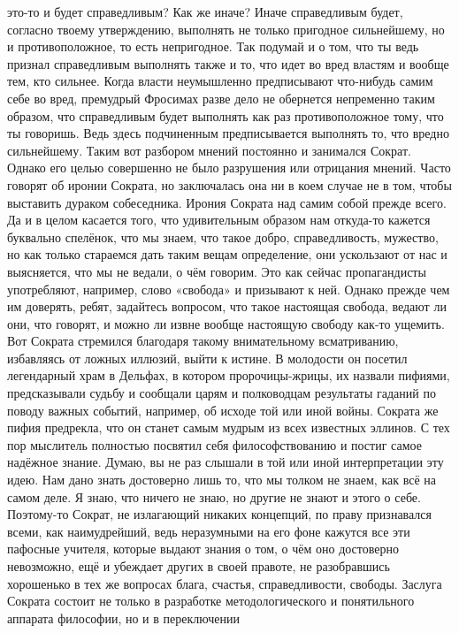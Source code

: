 это-то и будет справедливым? Как же иначе? Иначе справедливым будет, согласно
твоему утверждению, выполнять не только пригодное сильнейшему, но и
противоположное, то есть непригодное. Так подумай и о том, что ты ведь признал
справедливым выполнять также и то, что идет во вред властям и вообще тем, кто
сильнее. Когда власти неумышленно предписывают что-нибудь самим себе во вред,
премудрый Фросимах разве дело не обернется непременно таким образом, что
справедливым будет выполнять как раз противоположное тому, что ты говоришь. Ведь
здесь подчиненным предписывается выполнять то, что вредно сильнейшему. Таким вот
разбором мнений постоянно и занимался Сократ. Однако его целью совершенно не
было разрушения или отрицания мнений. Часто говорят об иронии Сократа, но
заключалась она ни в коем случае не в том, чтобы выставить дураком собеседника.
Ирония Сократа над самим собой прежде всего. Да и в целом касается того, что
удивительным образом нам откуда-то кажется буквально спелёнок, что мы знаем, что
такое добро, справедливость, мужество, но как только стараемся дать таким вещам
определение, они ускользают от нас и выясняется, что мы не ведали, о чём
говорим. Это как сейчас пропагандисты употребляют, например, слово «свобода» и
призывают к ней. Однако прежде чем им доверять, ребят, задайтесь вопросом, что
такое настоящая свобода, ведают ли они, что говорят, и можно ли извне вообще
настоящую свободу как-то ущемить. Вот Сократа стремился благодаря такому
внимательному всматриванию, избавляясь от ложных иллюзий, выйти к истине. В
молодости он посетил легендарный храм в Дельфах, в котором пророчицы-жрицы, их
назвали пифиями, предсказывали судьбу и сообщали царям и полководцам результаты
гаданий по поводу важных событий, например, об исходе той или иной войны.
Сократа же пифия предрекла, что он станет самым мудрым из всех известных
эллинов. С тех пор мыслитель полностью посвятил себя философствованию и постиг
самое надёжное знание. Думаю, вы не раз слышали в той или иной интерпретации эту
идею. Нам дано знать достоверно лишь то, что мы толком не знаем, как всё на
самом деле. Я знаю, что ничего не знаю, но другие не знают и этого о себе.
Поэтому-то Сократ, не излагающий никаких концепций, по праву признавался всеми,
как наимудрейший, ведь неразумными на его фоне кажутся все эти пафосные учителя,
которые выдают знания о том, о чём оно достоверно невозможно, ещё и убеждает
других в своей правоте, не разобравшись хорошенько в тех же вопросах блага,
счастья, справедливости, свободы. Заслуга Сократа состоит не только в разработке
методологического и понятильного аппарата философии, но и в переключении
